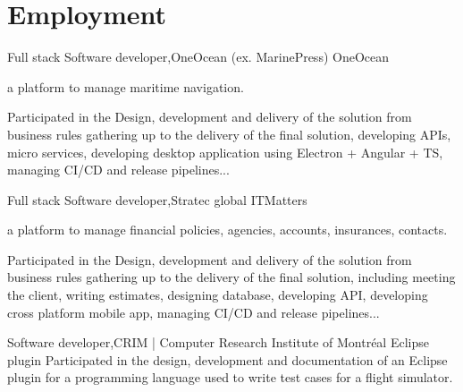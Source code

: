\section{Employment}
  \resumeSubHeadingListStart
    \resumeSubheading
    {Full stack Software developer,}{OneOcean (ex. MarinePress)}{}
    {}
      \resumeItemListStart
      \renewcommand{\labelitemii}{\raisebox{.65cm}{$\bullet$}}
        \resumeItem
          {OneOcean} {a platform to manage maritime navigation.

          Participated in the Design, development and delivery of the solution from business rules gathering 
          up to the delivery of the final solution, developing APIs, micro services, developing desktop application using Electron + Angular + TS,
          managing CI/CD and release pipelines...}
        \renewcommand{\labelitemii}{\scriptsize \raisebox{.25cm}{\ding{118}}}
      \resumeItemListEnd

    \resumeSubheading
    {Full stack Software developer,}{Stratec global}{}
    {}
      \resumeItemListStart
      \renewcommand{\labelitemii}{\raisebox{.65cm}{$\bullet$}}
        \resumeItem
         {ITMatters} {a platform to manage financial policies, agencies, accounts, insurances, contacts.

         Participated in the Design, development and delivery of the solution from business rules gathering 
         up to the delivery of the final solution, including meeting the client, writing estimates, designing database, 
         developing API, developing cross platform mobile app, managing CI/CD and release pipelines...}
        \renewcommand{\labelitemii}{\scriptsize \raisebox{.25cm}{\ding{118}}}
      \resumeItemListEnd
    
    \resumeSubheading
    {Software developer,}{CRIM | Computer Research Institute of Montréal}{}
    {}
      \resumeItemListStart
      \renewcommand{\labelitemii}{\raisebox{.25cm}{$\bullet$}}
        \resumeItem
         {Eclipse plugin}
         {Participated in the design, development and documentation of an Eclipse plugin for a programming language 
          used to write test cases for a flight simulator.}
        \renewcommand{\labelitemii}{\scriptsize \raisebox{.0cm}{\ding{118}}}
      \resumeItemListEnd

